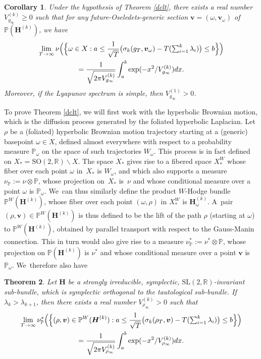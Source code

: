 \documentclass[10pt]{amsart}
\theoremstyle{plain}
\newtheorem{thm}{Theorem}[section]
\newtheorem{cor}[thm]{Corollary}
\theoremstyle{definition}
\numberwithin{equation}{subsection}
\newcommand\bP{\mathbb{P}}
\newcommand\bR{\mathbb{R}}\let\R\bR
\newcommand{\SL}{\mathrm{SL}}
\newcommand{\SO}{\mathrm{SO}}
\newcommand{\bfH}{\boldsymbol{H}}
\newcommand{\bfv}{\boldsymbol{v}}
\newcommand{\defeq}{:=}
\begin{document}
\begin{cor}
Under the hypothesis of Theorem \ref{dclt}, there exists a real number $V^{(k)}_{g_\infty} \geq 0$ such that for any future-Oseledets-generic section $\bfv=(\omega,\bfv_{\omega})$ of $\bP(\bfH^{(k)})$, we have
\begin{multline*}
\lim_{T\to\infty} \nu\Bigl(\Bigl\{\omega\in X :a \leq \frac{1}{\sqrt{T}} \bigl(\sigma_k(g_{T}, \bfv_\omega)- T(\textstyle\sum_{i=1}^k \lambda_i) \bigr) \leq b \Bigr\} \Bigr)
\\= \frac{1}{\sqrt{2\pi V^{(k)}_{g_\infty}}}\int_a^b\exp(-x^2/ V^{(k)}_{g_\infty})dx.
\end{multline*}
Moreover, if the Lyapunov spectrum is simple, then $V^{(1)}_{g_\infty} > 0$.
\end{cor}

To prove Theorem \ref{dclt}, we will first work with the hyperbolic Brownian motion, which is the diffusion process generated by the foliated hyperbolic Laplacian. Let $\rho$ be a (foliated) hyperbolic Brownian motion trajectory starting at a (generic) basepoint $\omega \in X$, defined almost everywhere with respect to a probability measure $\bP_\omega$ on the space of such trajectories $W_\omega$. This process is in fact defined on $X_* = \SO(2,\bR)\backslash X$. The space $X_*$ gives rise to a fibered space $X^{W}_*$ whose fiber over each point $\omega$ in~$X_*$ is $W_\omega$, and which also supports a measure $\nu_{\bP} \defeq \nu \otimes \bP$, whose projection on~$X_*$ is~$\nu$ and whose conditional measure over a point $\omega$ is $\bP_\omega$. We~can thus similarly define the product $W$-Hodge bundle $\bP^W(\bfH^{(k)})$, whose fiber over each point $(\omega,\rho)$ in $X^{W}_*$ is $\bfH^{(k)}_\omega$. A~pair $(\rho,\bfv) \in \bP^W(\bfH^{(k)})$ is thus defined to be the lift of the path $\rho$ (starting at $\omega$) to $\bP^W(\bfH^{(k)})$, obtained by parallel transport with respect to the Gauss-Manin connection. This in turn would also give rise to a measure $\nu^*_{\bP}\defeq \nu^* \otimes \bP$, whose projection on $\bP(\bfH^{(k)})$ is $\nu^*$ and whose conditional measure over a point $\bfv$ is $\bP_\omega$. We~therefore also have


\begin{thm}\label{rclt}
Let $\bfH$ be a strongly irreducible, symplectic, $\SL(2,\R)$-invariant sub-bundle, which is symplectic orthogonal to the tautological sub-bundle. If $\lambda_k > \lambda_{k+1}$, then there exists a real number $V^{(k)}_{\rho_\infty} > 0$ such that
\begin{multline*}
\lim_{T\to\infty}\nu^*_{\bP} \Bigl(\Bigl\{(\rho,\bfv) \in \bP^W(\bfH^{(k)}) : a \leq \frac{1}{\sqrt{T}} \bigl(\sigma_k(\rho_{T}, \bfv)- T(\textstyle\sum_{i=1}^k\lambda_{i}) \bigr) \leq b \Bigr\} \Bigr)
\\ = \frac{1}{\sqrt{2\pi V^{(k)}_{\rho_\infty}}}\int_a^b\exp(-x^2/V^{(k)}_{\rho_\infty})dx.
\end{multline*}
\end{thm}
\end{document}
